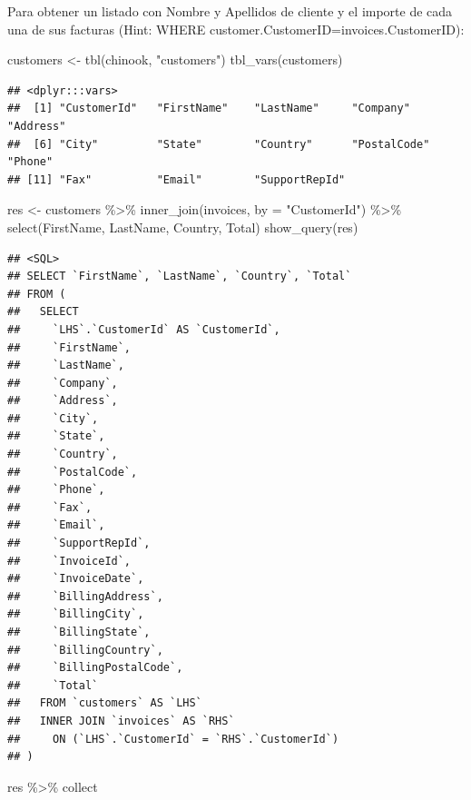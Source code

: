 \documentclass[
]{book}
\newenvironment{Shaded}{\begin{snugshade}}{\end{snugshade}}
\newcommand{\AttributeTok}[1]{\textcolor[rgb]{0.77,0.63,0.00}{#1}}
\newcommand{\FunctionTok}[1]{\textcolor[rgb]{0.00,0.00,0.00}{#1}}
\newcommand{\NormalTok}[1]{#1}
\newcommand{\OtherTok}[1]{\textcolor[rgb]{0.56,0.35,0.01}{#1}}
\newcommand{\SpecialCharTok}[1]{\textcolor[rgb]{0.00,0.00,0.00}{#1}}
\newcommand{\StringTok}[1]{\textcolor[rgb]{0.31,0.60,0.02}{#1}}
\theoremstyle{break}
\theoremstyle{nonumberplain}
\begin{document}
Para obtener un listado con Nombre y Apellidos de cliente y el importe de cada una de sus facturas (Hint: WHERE customer.CustomerID=invoices.CustomerID):

\begin{Shaded}
\begin{Highlighting}[]
\NormalTok{customers }\OtherTok{\textless{}{-}} \FunctionTok{tbl}\NormalTok{(chinook, }\StringTok{"customers"}\NormalTok{)}
\FunctionTok{tbl\_vars}\NormalTok{(customers) }
\end{Highlighting}
\end{Shaded}

\begin{verbatim}
## <dplyr:::vars>
##  [1] "CustomerId"   "FirstName"    "LastName"     "Company"      "Address"     
##  [6] "City"         "State"        "Country"      "PostalCode"   "Phone"       
## [11] "Fax"          "Email"        "SupportRepId"
\end{verbatim}

\begin{Shaded}
\begin{Highlighting}[]
\NormalTok{res }\OtherTok{\textless{}{-}}\NormalTok{ customers }\SpecialCharTok{\%\textgreater{}\%} \FunctionTok{inner\_join}\NormalTok{(invoices, }\AttributeTok{by =} \StringTok{"CustomerId"}\NormalTok{) }\SpecialCharTok{\%\textgreater{}\%} \FunctionTok{select}\NormalTok{(FirstName, LastName, Country, Total) }
\FunctionTok{show\_query}\NormalTok{(res)}
\end{Highlighting}
\end{Shaded}

\begin{verbatim}
## <SQL>
## SELECT `FirstName`, `LastName`, `Country`, `Total`
## FROM (
##   SELECT
##     `LHS`.`CustomerId` AS `CustomerId`,
##     `FirstName`,
##     `LastName`,
##     `Company`,
##     `Address`,
##     `City`,
##     `State`,
##     `Country`,
##     `PostalCode`,
##     `Phone`,
##     `Fax`,
##     `Email`,
##     `SupportRepId`,
##     `InvoiceId`,
##     `InvoiceDate`,
##     `BillingAddress`,
##     `BillingCity`,
##     `BillingState`,
##     `BillingCountry`,
##     `BillingPostalCode`,
##     `Total`
##   FROM `customers` AS `LHS`
##   INNER JOIN `invoices` AS `RHS`
##     ON (`LHS`.`CustomerId` = `RHS`.`CustomerId`)
## )
\end{verbatim}

\begin{Shaded}
\begin{Highlighting}[]
\NormalTok{res  }\SpecialCharTok{\%\textgreater{}\%}\NormalTok{ collect}
\end{Highlighting}
\end{Shaded}
\end{document}
